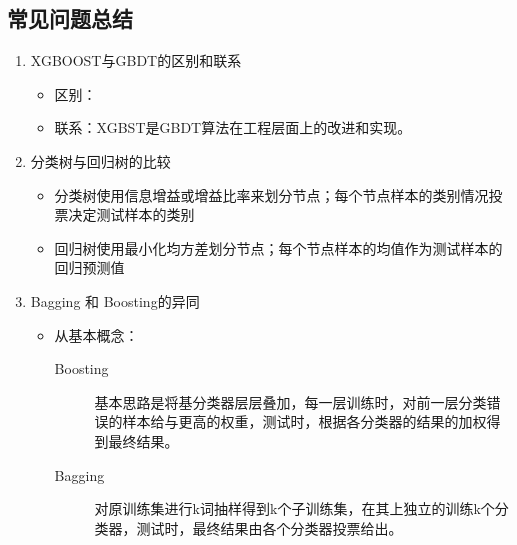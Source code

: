 \documentclass[UTF8]{article}%
\begin{document}
		\subsection{常见问题总结}
			\begin{enumerate}
				\item XGBOOST与GBDT的区别和联系
				\begin{itemize}
					\item 区别：
					\item 联系：XGBST是GBDT算法在工程层面上的改进和实现。
				\end{itemize}
				\item 分类树与回归树的比较
				\begin{itemize}
					\item 分类树使用信息增益或增益比率来划分节点；每个节点样本的类别情况投票决定测试样本的类别
					\item 回归树使用最小化均方差划分节点；每个节点样本的均值作为测试样本的回归预测值
				\end{itemize}
				\item Bagging 和 Boosting的异同
				\begin{itemize}
					\item 从基本概念：
						\begin{description}
							\item[Boosting] 基本思路是将基分类器层层叠加，每一层训练时，对前一层分类错误的样本给与更高的权重，测试时，根据各分类器的结果的加权得到最终结果。
							\item[Bagging]  对原训练集进行k词抽样得到k个子训练集，在其上独立的训练k个分类器，测试时，最终结果由各个分类器投票给出。
						\end{description}

\end{itemize}
\end{enumerate}
\end{document}
